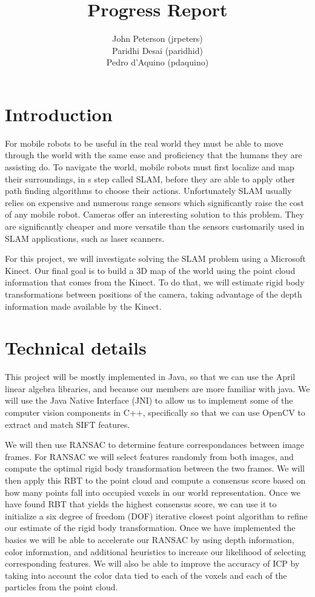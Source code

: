 \documentclass[12pt]{article}
\title{Progress Report}
\author{
	John Peterson (jrpeters)\\
	Paridhi Desai (paridhid)\\
	Pedro d'Aquino (pdaquino)}
\begin{document}
\maketitle

\section{Introduction}
For mobile robots to be useful in the real world they must be able to move through the world 
with the same ease and proficiency that the humans they are assisting do.  To navigate the world, 
mobile robots must first localize and map their surroundings, in s step called SLAM, before they are 
able to apply other path finding algorithms to choose their actions.   Unfortunately SLAM usually relies 
on expensive and numerous range sensors which significantly raise the cost of any mobile robot. Cameras
offer an interesting solution to this problem.  They are significantly cheaper and more versatile than the 
sensors customarily used in SLAM applications, such as laser scanners.

For this project, we will investigate solving the SLAM problem using a Microsoft Kinect. Our final goal is
to build a 3D map of the world using the point cloud information that comes from the Kinect. To do that, we
will estimate rigid body transformations between positions of the camera, taking advantage of the depth information
made available by the Kinect.

\section{Technical details}
	This project will be mostly implemented in Java, so that we can use the April linear algebra libraries, and because our members are more familiar with java.  We will use the Java Native Interface (JNI) to allow us to implement some of the computer vision components in C++, specifically so that we can use OpenCV to extract and match SIFT features. 

	We will then use RANSAC to determine feature correspondances between image frames.  For RANSAC we will select features randomly from both images, and compute the optimal rigid body transformation between the two frames.  We will then apply this RBT to the point cloud and compute a consensus score based on how many points fall into occupied voxels in our world representation.  Once we have found RBT that yields the highest consensus score, we can use it to initialize a six degree of freedom (DOF) iterative closest point algorithm to refine our estimate of the rigid body transformation.  Once we have implemented the basics we will be able to accelerate our RANSAC by using depth information, color information, and additional heuristics to increase our likelihood of selecting corresponding features.  We will also be able to improve the accuracy of ICP by taking into account the color data tied to each of the voxels and each of the particles from the point cloud. 
\end{document}
